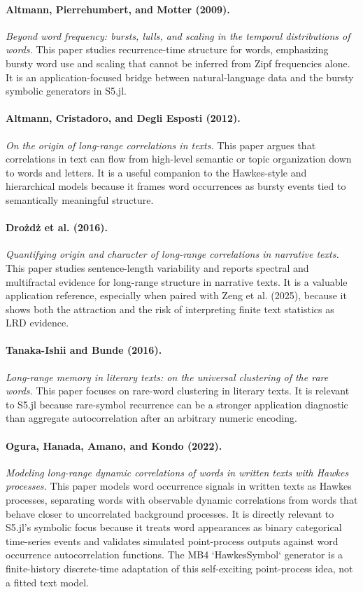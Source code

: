 \documentclass[11pt]{article}
\begin{document}
\paragraph{Altmann, Pierrehumbert, and Motter (2009).}
\emph{Beyond word frequency: bursts, lulls, and scaling in the temporal
distributions of words.}
This paper studies recurrence-time structure for words, emphasizing bursty word
use and scaling that cannot be inferred from Zipf frequencies alone. It is an
application-focused bridge between natural-language data and the bursty symbolic
generators in S5.jl.

\paragraph{Altmann, Cristadoro, and Degli Esposti (2012).}
\emph{On the origin of long-range correlations in texts.}
This paper argues that correlations in text can flow from high-level semantic or
topic organization down to words and letters. It is a useful companion to the
Hawkes-style and hierarchical models because it frames word occurrences as
bursty events tied to semantically meaningful structure.

\paragraph{Drożdż et al. (2016).}
\emph{Quantifying origin and character of long-range correlations in narrative
texts.}
This paper studies sentence-length variability and reports spectral and
multifractal evidence for long-range structure in narrative texts. It is a
valuable application reference, especially when paired with Zeng et al. (2025),
because it shows both the attraction and the risk of interpreting finite text
statistics as LRD evidence.

\paragraph{Tanaka-Ishii and Bunde (2016).}
\emph{Long-range memory in literary texts: on the universal clustering of the
rare words.}
This paper focuses on rare-word clustering in literary texts. It is relevant to
S5.jl because rare-symbol recurrence can be a stronger application diagnostic
than aggregate autocorrelation after an arbitrary numeric encoding.

\paragraph{Ogura, Hanada, Amano, and Kondo (2022).}
\emph{Modeling long-range dynamic correlations of words in written texts with
Hawkes processes.}
This paper models word occurrence signals in written texts as Hawkes processes,
separating words with observable dynamic correlations from words that behave
closer to uncorrelated background processes. It is directly relevant to S5.jl's
symbolic focus because it treats word appearances as binary categorical
time-series events and validates simulated point-process outputs against word
occurrence autocorrelation functions. The MB4 `HawkesSymbol` generator is a
finite-history discrete-time adaptation of this self-exciting point-process
idea, not a fitted text model.
\end{document}
